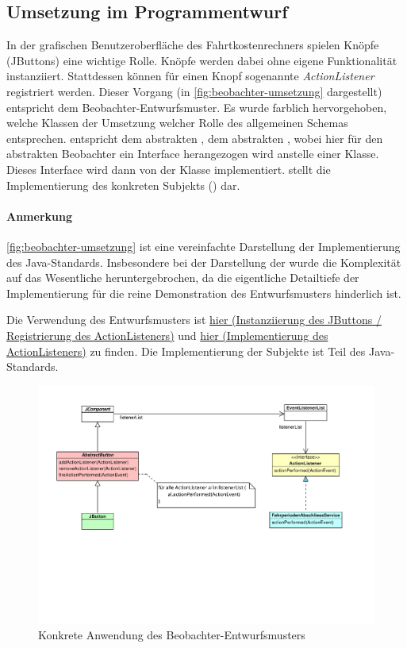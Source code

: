 \subsection{Umsetzung im Programmentwurf}
In der grafischen Benutzeroberfläche des Fahrtkostenrechners spielen Knöpfe (JButtons) eine wichtige Rolle.
Knöpfe werden dabei ohne eigene Funktionalität instanziiert.
Stattdessen können für einen Knopf sogenannte \emph{ActionListener} registriert werden.
Dieser Vorgang (in \autoref{fig:beobachter-umsetzung} dargestellt) entspricht dem Beobachter-Entwurfsmuster.
Es wurde farblich hervorgehoben, welche Klassen der Umsetzung welcher Rolle des allgemeinen Schemas entsprechen.
 entspricht dem abstrakten ,  dem abstrakten , wobei hier für den abstrakten Beobachter ein Interface herangezogen wird anstelle einer Klasse.
Dieses Interface wird dann von der Klasse  implementiert.
 stellt die Implementierung des konkreten Subjekts () dar.

\paragraph{Anmerkung}
\autoref{fig:beobachter-umsetzung} ist eine vereinfachte Darstellung der Implementierung des Java-Standards.
Insbesondere bei der Darstellung der  wurde die Komplexität auf das Wesentliche heruntergebrochen, da die eigentliche Detailtiefe der Implementierung für die reine Demonstration des Entwurfsmusters hinderlich ist.

Die Verwendung des Entwurfsmusters ist \href{https://github.com/yschiebelhut/carpool-java/blob/fcc3bbaff5e8908a5f768b7fd3e79f1d2285acb6/0-carpool-java-plugin-ui/src/main/java/gui/FahrperiodeGUI.java#L103}{hier (Instanziierung des JButtons / Registrierung des ActionListeners)} und \href{https://github.com/yschiebelhut/carpool-java/blob/fcc3bbaff5e8908a5f768b7fd3e79f1d2285acb6/2-carpool-java-application/src/main/java/services/FahrperiodenAbschliessService.java}{hier (Implementierung des ActionListeners)} zu finden.
Die Implementierung der Subjekte ist Teil des Java-Standards.

\begin{figure}
    \centering
    \includegraphics[width=\textwidth, trim = 0cm 7cm 0cm 0cm]{../VPP/Beobachter-Umsetzung.pdf}
    \caption{Konkrete Anwendung des Beobachter-Entwurfsmusters}
    \label{fig:beobachter-umsetzung}
\end{figure}